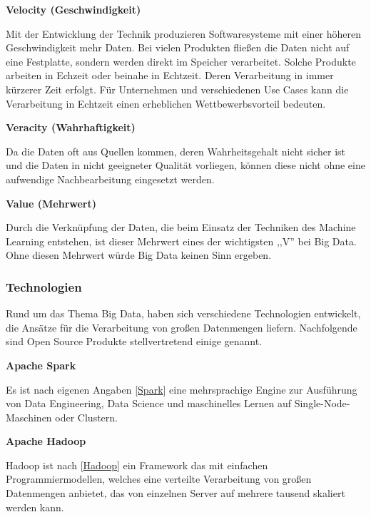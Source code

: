 \textbf{Velocity (Geschwindigkeit)}\vspace{0.2cm}

Mit der Entwicklung der Technik produzieren Softwaresysteme mit einer höheren Geschwindigkeit mehr Daten. Bei vielen Produkten fließen die Daten nicht auf eine Festplatte, sondern werden direkt im Speicher verarbeitet. Solche Produkte arbeiten in Echzeit oder beinahe in Echtzeit. Deren Verarbeitung in immer kürzerer Zeit erfolgt. Für Unternehmen und verschiedenen Use Cases kann die Verarbeitung in Echtzeit einen erheblichen Wettbewerbsvorteil bedeuten.\vspace{0.5cm}

\textbf{Veracity (Wahrhaftigkeit)}\vspace{0.2cm}

Da die Daten oft aus Quellen kommen, deren Wahrheitsgehalt nicht sicher ist und die Daten in nicht geeigneter Qualität vorliegen, können diese nicht ohne eine aufwendige Nachbearbeitung eingesetzt werden.\vspace{0.5cm}

\textbf{Value (Mehrwert)}\vspace{0.2cm}

Durch die Verknüpfung der Daten, die beim Einsatz der Techniken des Machine Learning entstehen, ist dieser Mehrwert eines der wichtigsten ,,V'' bei Big Data. Ohne diesen Mehrwert würde Big Data keinen Sinn ergeben.

\subsubsection{Technologien}
Rund um das Thema Big Data, haben sich verschiedene Technologien entwickelt, die Ansätze für die Verarbeitung von großen Datenmengen liefern. Nachfolgende sind Open Source Produkte stellvertretend einige genannt.\vspace{0.2cm}

\textbf{Apache Spark}\vspace{0.2cm}

Es ist nach eigenen Angaben [\href{https://spark.apache.org}{Spark}] eine mehrsprachige Engine zur Ausführung von Data Engineering, Data Science und maschinelles Lernen auf Single-Node-Maschinen oder Clustern.\vspace{0.5cm}

\textbf{Apache Hadoop}\vspace{0.2cm}

Hadoop ist nach [\href{https://hadoop.apache.org}{Hadoop}] ein Framework das mit einfachen Programmiermodellen, welches eine verteilte Verarbeitung von großen Datenmengen anbietet, das von einzelnen Server auf mehrere tausend skaliert werden kann.\vspace{0.5cm}

